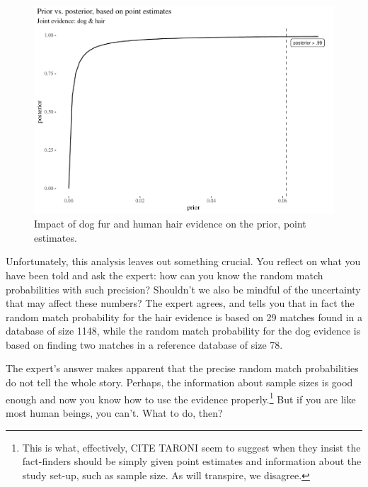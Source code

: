 \documentclass[
  10pt,
  dvipsnames,enabledeprecatedfontcommands]{scrartcl}
\begin{document}
\begin{figure}[H]

\begin{center}\includegraphics[width=0.6\linewidth]{paper-outline_files/figure-latex/impactOfPoint4-1} \end{center}
\caption{Impact of dog fur and human hair evidence on the prior, point estimates.}
\label{fig:impactOfPoint}
\end{figure}

Unfortunately, this analysis leaves out something crucial. You reflect
on what you have been told and ask the expert: how can you know the
random match probabilities with such precision? Shouldn't we also be
mindful of the uncertainty that may affect these numbers? The expert
agrees, and tells you that in fact the random match probability for the
hair evidence is based on 29 matches found in a database of size 1148,
while the random match probability for the dog evidence is based on
finding two matches in a reference database of size 78.

The expert's answer makes apparent that the precise random match
probabilities do not tell the whole story. Perhaps, the information
about sample sizes is good enough and now you know how to use the
evidence properly.\footnote{This is what, effectively, CITE TARONI seem
  to suggest when they insist the fact-finders should be simply given
  point estimates and information about the study set-up, such as sample
  size. As will transpire, we disagree.} But if you are like most human
beings, you can't. What to do, then?\\
\end{document}
